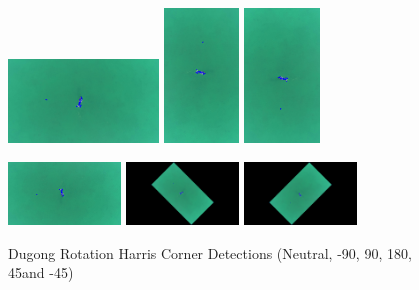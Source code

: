 \documentclass[conference]{IEEEtran}
\begin{document}
\begin{figure}[H]
    \centerline{
        {\includegraphics[width=40mm, scale=0.5]{./figures/Harris Corner/DugongNeutral Corners.png}}
        {\includegraphics[width=20mm, scale=0.5]{./figures/Harris Corner/DugongDeg 90 Corners.png}}
        {\includegraphics[width=20mm, scale=0.5]{./figures/Harris Corner/DugongDeg -90 Corners.png}}
    }
    \centerline{
        {\includegraphics[width=30mm, scale=0.5]{./figures/Harris Corner/Dugong180 Deg Corners.png}}
        {\includegraphics[width=30mm, scale=0.5]{./figures/Harris Corner/DugongDeg -45 Corners.png}}
        {\includegraphics[width=30mm, scale=0.5]{./figures/Harris Corner/DugongDeg 45 Corners.png}}
    }
    \caption{Dugong Rotation Harris Corner Detections (Neutral, -90\degree, 90\degree, 180\degree, 45\degree and -45\degree)}
    \label{fig}
\end{figure}
\end{document}
